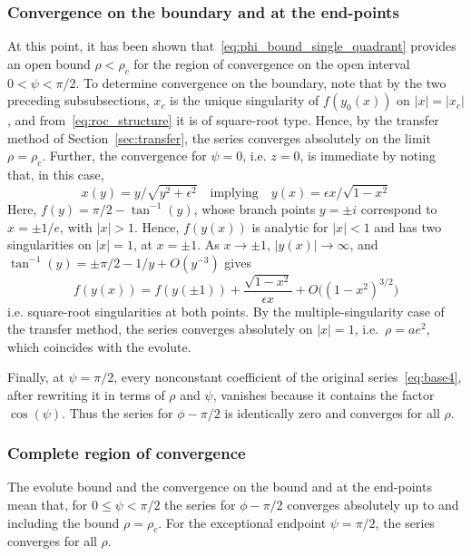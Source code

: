 \documentclass[a4paper]{amsart}
\begin{document}
\subsubsection{Convergence on the boundary and at the end-points}
At this point, it has been shown that~\eqref{eq:phi_bound_single_quadrant} provides an open bound $\rho<\rho_c$ for the region of convergence on the open interval $0<\psi<\pi/2$. To determine convergence on the boundary, note that by the two preceding subsubsections, $x_c$ is the unique singularity of $f(y_0(x))$ on $|x|=|x_c|$, and from~\eqref{eq:roc_structure} it is of square-root type. Hence, by the transfer method of Section~\ref{sec:transfer}, the series converges absolutely on the limit $\rho=\rho_c$.
%
Further, the convergence for $\psi=0$, i.e. $z=0$, is immediate by noting that, in this case,
\begin{equation*}
x(y)=y/\sqrt{y^2+\epsilon^2}\quad\text{implying}\quad y(x)=\epsilon x/\sqrt{1-x^2}
\end{equation*}
Here, $f(y)=\pi/2-\tan^{-1}(y)$, whose branch points $y=\pm i$ correspond to $x=\pm1/e$, with $|x|>1$. Hence, $f(y(x))$ is analytic for $|x|<1$ and has two singularities on $|x|=1$, at $x=\pm1$. As $x\to\pm1$, $|y(x)|\to\infty$, and $\tan^{-1}(y)=\pm\pi/2-1/y+O(y^{-3})$ gives
\begin{equation*}
f(y(x))=f(y(\pm1))+\frac{\sqrt{1-x^2}}{\epsilon x}+O\big((1-x^2)^{3/2}\big)
\end{equation*}
i.e. square-root singularities at both points. By the multiple-singularity case of the transfer method, the series converges absolutely on $|x|=1$, i.e.\ $\rho=ae^2$, which coincides with the evolute.

Finally, at $\psi=\pi/2$, every nonconstant coefficient of the original series~\eqref{eq:base4}, after rewriting it in terms of $\rho$ and $\psi$, vanishes because it contains the factor $\cos(\psi)$. Thus the series for $\phi-\pi/2$ is identically zero and converges for all $\rho$.


\subsubsection{Complete region of convergence}
The evolute bound and the convergence on the bound and at the end-points mean that, for $0\leq\psi<\pi/2$ the series for $\phi-\pi/2$ converges absolutely up to and including the bound $\rho=\rho_c$. For the exceptional endpoint $\psi=\pi/2$, the series converges for all $\rho$.
\end{document}
